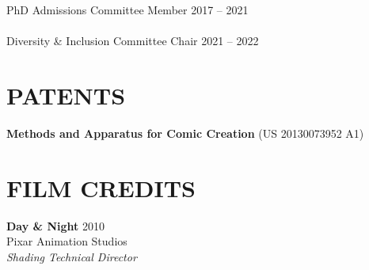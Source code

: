 \documentclass[line,margin]{res}
\begin{document}
\begin{resume}
PhD Admissions Committee Member \hfill 2017 -- 2021
\\ \\
Diversity \& Inclusion Committee Chair \hfill 2021 -- 2022








\section{PATENTS}

\newcommand{\patent}[2] {
	\textbf{#1} (#2)
}

\patent
{Methods and Apparatus for Comic Creation}
{US 20130073952 A1}


\section{FILM CREDITS}

\newcommand{\filmcred}[4] {
	\textbf{#1} \hfill #2
	\\
	#3
	\\
	\emph{#4}
}

\filmcred
{Day \& Night}
{2010}
{Pixar Animation Studios}
{Shading Technical Director}




\end{resume}
\end{document}
